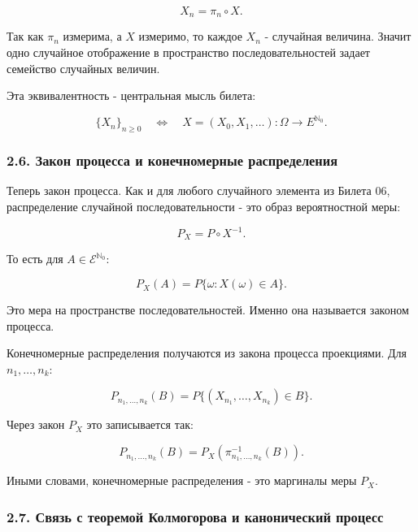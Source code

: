 \documentclass[
  11pt,
  a4paper,
]{article}
\begin{document}
\[
X_n=\pi_n\circ X.
\]

Так как \(\pi_n\) измерима, а \(X\) измеримо, то каждое \(X_n\) -
случайная величина. Значит одно случайное отображение в пространство
последовательностей задает семейство случайных величин.

Эта эквивалентность - центральная мысль билета:

\[
\{X_n\}_{n\ge0}
\quad\Longleftrightarrow\quad
X=(X_0,X_1,\ldots):\Omega\to E^{\mathbb N_0}.
\]

\subsubsection{2.6. Закон процесса и конечномерные
распределения}\label{ux437ux430ux43aux43eux43d-ux43fux440ux43eux446ux435ux441ux441ux430-ux438-ux43aux43eux43dux435ux447ux43dux43eux43cux435ux440ux43dux44bux435-ux440ux430ux441ux43fux440ux435ux434ux435ux43bux435ux43dux438ux44f}

Теперь закон процесса. Как и для любого случайного элемента из Билета
06, распределение случайной последовательности - это образ вероятностной
меры:

\[
P_X=P\circ X^{-1}.
\]

То есть для \(A\in\mathcal E^{\mathbb N_0}\):

\[
P_X(A)=P\{\omega:X(\omega)\in A\}.
\]

Это мера на пространстве последовательностей. Именно она называется
законом процесса.

Конечномерные распределения получаются из закона процесса проекциями.
Для \(n_1,\ldots,n_k\):

\[
P_{n_1,\ldots,n_k}(B)
=
P\{(X_{n_1},\ldots,X_{n_k})\in B\}.
\]

Через закон \(P_X\) это записывается так:

\[
P_{n_1,\ldots,n_k}(B)
=
P_X(\pi_{n_1,\ldots,n_k}^{-1}(B)).
\]

Иными словами, конечномерные распределения - это маргиналы меры \(P_X\).

\subsubsection{2.7. Связь с теоремой Колмогорова и канонический
процесс}\label{ux441ux432ux44fux437ux44c-ux441-ux442ux435ux43eux440ux435ux43cux43eux439-ux43aux43eux43bux43cux43eux433ux43eux440ux43eux432ux430-ux438-ux43aux430ux43dux43eux43dux438ux447ux435ux441ux43aux438ux439-ux43fux440ux43eux446ux435ux441ux441}
\end{document}
